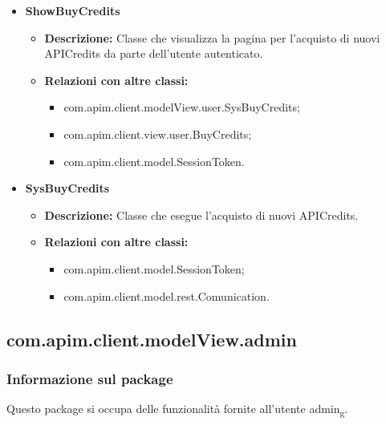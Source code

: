 {{{\begin{itemize}
				\item \textbf{ShowBuyCredits}
					\begin{itemize}
						\item \textbf{Descrizione:} Classe che visualizza la pagina per l'acquisto di nuovi APICredits da parte dell'utente autenticato.
						\item \textbf{Relazioni con altre classi:}
						\begin{itemize}
							\item com.apim.client.modelView.user.SysBuyCredits;
							\item com.apim.client.view.user.BuyCredits;
							\item com.apim.client.model.SessionToken.
						\end{itemize}
					\end{itemize}
				\item \textbf{SysBuyCredits}
					\begin{itemize}
						\item \textbf{Descrizione:} Classe che esegue l'acquisto di nuovi APICredits.
						\item \textbf{Relazioni con altre classi:}
						\begin{itemize}
							\item com.apim.client.model.SessionToken;
							\item com.apim.client.model.rest.Comunication.
						\end{itemize}
					\end{itemize}
			\end{itemize}
		}
	}
	\subsection{com.apim.client.modelView.admin}{
		\subsubsection{Informazione sul package}{
			Questo package si occupa delle funzionalità fornite all'utente admin\textsubscript{g}.
		}
}}
